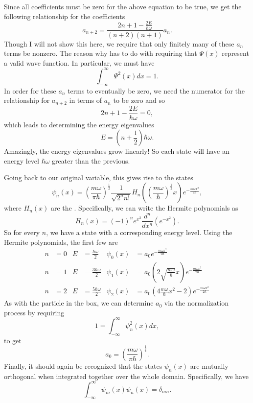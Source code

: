 Since all coefficients must be zero for the above equation to be true, we get the following relationship for the coefficients
\[
a_{n+2} = \frac{2n+1-\frac{2E}{\hbar \omega}}{(n+2)(n+1)}a_n.
\]
Though I will not show this here, we require that only finitely many of these $a_n$ terms be nonzero.  The reason why has to do with requiring that $\Psi(x)$ represent a valid wave function. In particular, we must have
\[
\int_{-\infty}^\infty \Psi^2(x) dx = 1.
\]
In order for these $a_n$ terms to eventually be zero, we need the numerator for the relationship for $a_{n+2}$ in terms of $a_n$ to be zero and so
\[
2n+1-\frac{2E}{\hbar \omega} =0,
\]
which leads to determining the energy eigenvalues
\[
\boxed{E=\left(n+\frac{1}{2}\right) \hbar \omega.}
\]
Amazingly, the energy eigenvalues grow linearly! So each state will have an energy level $\hbar \omega$ greater than the previous. 

Going back to our original variable, this gives rise to the states
\[
\psi_n(x) = \left(\frac{m \omega}{\pi \hbar}\right)^{\frac{1}{2}} \frac{1}{\sqrt{2^n n!}} H_n\left(\left(\frac{m\omega}{\hbar}\right)^{\frac{1}{2}} x\right) e^{-\frac{m\omega x^2}{2\hbar}},
\]
where $H_n(x)$ are the  .  Specifically, we can write the Hermite polynomials as
\[
H_n(x) = (-1)^n e^{x^2} \frac{d^n}{dx^n} \left(e^{-x^2}\right).
\]
So for every $n$, we have a state with a corresponding energy level. Using the Hermite polynomials, the first few are
\begin{align*}
    n&=0 & E&=\frac{\hbar \omega}{2} & \psi_0(x)&=a_0 e^{-\frac{m\omega x^2}{2\hbar}}\\
    n&=1 & E&=\frac{3\hbar \omega}{2} & \psi_1(x)&=a_0 \left(2\sqrt{\frac{m \omega}{\hbar}}x\right)e^{-\frac{m\omega x^2}{2\hbar}}\\
    n&=2 & E&=\frac{5\hbar \omega}{2} & \psi_2(x)&=a_0 \left(4\frac{m \omega}{\hbar}x^2-2\right)e^{-\frac{m\omega x^2}{2\hbar}}
\end{align*}
As with the particle in the box, we can determine $a_0$ via the normalization process by requiring 
\[
1=\int_{-\infty}^\infty \psi_n^2(x)dx,
\]
to get 
\[
a_0 = \left(\frac{m\omega}{\pi \hbar}\right)^{\frac{1}{4}}.
\]
Finally, it should again be recognized that the states $\psi_n(x)$ are mutually orthogonal when integrated together over the whole domain. Specifically, we have
\[
\int_{-\infty}^\infty \psi_m(x)\psi_n(x) = \delta_{mn}.
\]


